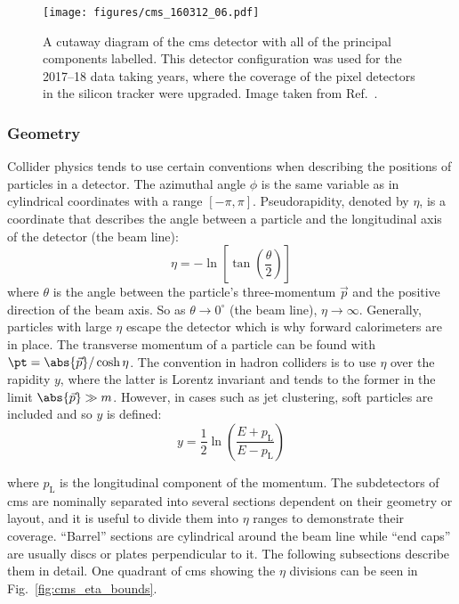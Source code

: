 \begin{figure}[htbp]
    \centering
    \texttt{[image: figures/cms\_160312\_06.pdf]}
    \caption[A cutaway diagram of the CMS detector with all of the principal components labelled. This detector configuration was used for the 2017--18 data taking years]{A cutaway diagram of the \acrshort{cms} detector with all of the principal components labelled. This detector configuration was used for the 2017--18 data taking years, where the coverage of the pixel detectors in the silicon tracker were upgraded. Image taken from Ref.~.}
    \label{fig:detector_cms_cutaway}
\end{figure}




\subsubsection{Geometry}
\label{subsubsec:geometry}

Collider physics tends to use certain conventions when describing the positions of particles in a detector. The azimuthal angle $\phi$ is the same variable as in cylindrical coordinates with a range $[-\pi, \pi]$. Pseudorapidity, denoted by $\eta$, is a coordinate that describes the angle between a particle and the longitudinal axis of the detector (the beam line):
\begin{equation}
    \eta = -\ln \left[ \tan(\frac{\theta}{2}) \right]
    \label{eq:eta_def}
\end{equation}
where $\theta$ is the angle between the particle's three-momentum $\vec{p}$ and the positive direction of the beam axis. So as $\theta \rightarrow \text{0}^{\circ}$ (the beam line), $\eta \rightarrow \infty$. Generally, particles with large $\eta$ escape the detector which is why forward calorimeters are in place. The transverse momentum of a particle can be found with $\pt = \abs{\vec{p}} / \cosh \eta$. The convention in hadron colliders is to use $\eta$ over the rapidity $y$, where the latter is Lorentz invariant and tends to the former in the limit $\abs{\vec{p}} \gg m$. However, in cases such as jet clustering, soft particles are included and so $y$ is defined:
\begin{equation}
    y = \frac{1}{2} \ln (\frac{ E + p_{\mathrm{L}} }{ E - p_{\mathrm{L}} })
    \label{eq:rapidity_def}
\end{equation}

where $p_{\mathrm{L}}$ is the longitudinal component of the momentum. The subdetectors of \acrshort{cms} are nominally separated into several sections dependent on their geometry or layout, and it is useful to divide them into $\eta$ ranges to demonstrate their coverage. ``Barrel'' sections are cylindrical around the beam line while ``end caps'' are usually discs or plates perpendicular to it. The following subsections describe them in detail. One quadrant of \acrshort{cms} showing the $\eta$ divisions can be seen in Fig.~\ref{fig:cms_eta_bounds}.


